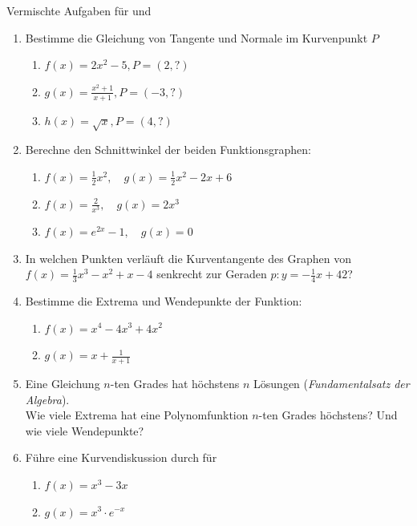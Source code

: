 \clearpage
\begin{ueb}
    {Vermischte Aufgaben für  und }{}
    \begin{enumerate}
        \item Bestimme die Gleichung von Tangente und Normale im Kurvenpunkt $P$
        \begin{enumerate}
            \item $f(x) = 2x^2-5, P=(2, ?)$
            \item $g(x) = \frac{x^2+1}{x+1}, P=(-3,?)$
            \item $h(x) = \sqrt{x}, P=(4,?)$
        \end{enumerate}
           \item Berechne den Schnittwinkel der beiden Funktionsgraphen:
    \begin{enumerate}
        \item $f(x) = \frac{1}{2}x^2, \quad g(x) = \frac{1}{2}x^2-2x+6$
        \item $f(x) = \frac{2}{x^3}, \quad g(x) = 2x^3$
        \item $f(x) = e^{2x}-1, \quad g(x) = 0$
        \end{enumerate}
    \item In welchen Punkten verläuft die Kurventangente des Graphen von $f(x) = \frac{1}{3} x^3-x^2+x-4$ senkrecht zur Geraden $p: y=-\frac{1}{4}x+42$?
    \item Bestimme die Extrema und Wendepunkte der Funktion:
    \begin{enumerate}
        \item $f(x) = x^4-4x^3+4x^2$
        \item $g(x) = x + \frac{1}{x+1}$
    \end{enumerate}
    \item Eine Gleichung $n$-ten Grades hat höchstens $n$ Lösungen (\emph{Fundamentalsatz der Algebra}). \\
    Wie viele Extrema hat eine Polynomfunktion $n$-ten Grades höchstens? Und wie viele Wendepunkte?
    \item Führe eine Kurvendiskussion durch für
    \begin{enumerate}
        \item $f(x) = x^3-3x$
        \item $g(x) = x^3\cdot e^{-x}$
    \end{enumerate}
    \end{enumerate}
\end{ueb}

